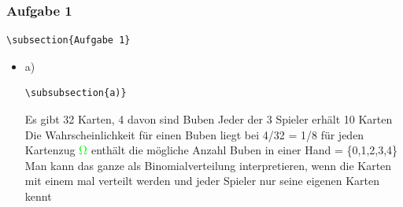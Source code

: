 \documentclass[11pt]{article}
\begin{document}
\subsubsection{Aufgabe 1}
\label{sec-3-8-2}


\begin{verbatim}
\subsection{Aufgabe 1}
\end{verbatim}
\begin{itemize}

\item a)\\
\label{sec-3-8-2-1}%
\begin{verbatim}
\subsubsection{a)}
\end{verbatim}
Es gibt 32 Karten, 4 davon sind Buben
Jeder der 3 Spieler erhält 10 Karten
Die Wahrscheinlichkeit für einen Buben liegt bei 4/32 = 1/8 für jeden Kartenzug
\includegraphics[width=.9\linewidth]{201212ad-1238161774nwx.png} enthält die mögliche Anzahl Buben in einer Hand = \{0,1,2,3,4\}
Man kann das ganze als Binomialverteilung interpretieren, wenn die Karten mit einem mal
verteilt werden und jeder Spieler nur seine eigenen Karten kennt

\end{itemize}
\end{document}

